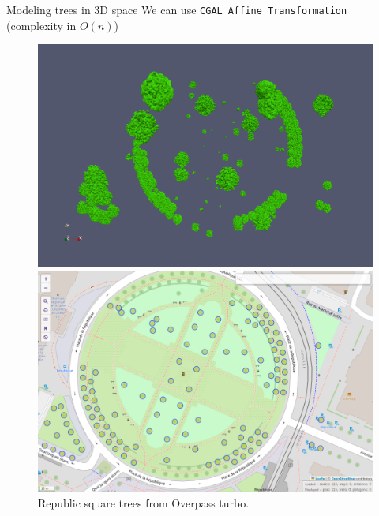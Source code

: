 \documentclass[10pt]{beamer}
\begin{document}
\begin{frame}{Modeling trees in 3D space}
We can use \texttt{CGAL Affine Transformation} \cite{cgal_affine_transformation} 
(complexity in $O(n)$)

\begin{figure}[H]
  \centering
  \begin{minipage}{0.49\textwidth}
      \centering
      \includegraphics[width=1\textwidth]{images/republic_lod3.png}
      \caption{Republic square with LOD 3 trees.}
  \end{minipage}\hfill
  \begin{minipage}{0.49\textwidth}
      \centering
      \includegraphics[width=1\textwidth]{images/republic_overpassturbo.png}
      \caption{Republic square trees from Overpass turbo.}
  \end{minipage}
\end{figure}
\end{frame}
\end{document}
